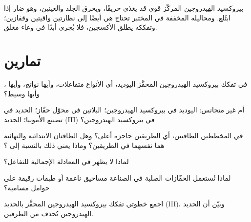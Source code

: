 \begin{safety}{}
بيروكسيد الهيدروجين المركّز  قوي قد يغذي حريقًا،
ويحرق الجلد والعينين، وهو ضار إذا ابتُلع. ومحاليله المخففة
في المختبر تحتاج هي أيضًا إلى نظارتين واقيتين وقفازين؛ وتفككه
يطلق الأكسجين، فلا يُجرى أبدًا في وعاء مغلق.
\end{safety}

\section{تمارين}


\begin{exercise}[$\star$]\label{exo:g12:catalysis:1}
في تفكك بيروكسيد الهيدروجين المحفَّز  اليوديد، أي
الأنواع متفاعلات، وأيها نواتج، وأيها ، وأيها
وسيط؟
\end{exercise}

\begin{exercise}[$\star$]\label{exo:g12:catalysis:2}
 أم غير متجانس:  اليوديد في  بيروكسيد
الهيدروجين؛ البلاتين في محوّل حفّاز؛ الحديد في تصنيع
الأمونيا؛  الحديد (III) في  بيروكسيد الهيدروجين؟
\end{exercise}

\begin{exercise}[$\star$]\label{exo:g12:catalysis:3}
في المخططين الطاقيين، أي الطريقين حاجزه أعلى؟ وهل الطاقتان
الابتدائية والنهائية هما نفسهما في الطريقين؟ وماذا يعني ذلك
بالنسبة إلى ؟
\end{exercise}

\begin{exercise}[$\star$]\label{exo:g12:catalysis:4}
لماذا لا يظهر  في المعادلة الإجمالية للتفاعل؟
\end{exercise}

\begin{exercise}[$\star$]\label{exo:g12:catalysis:5}
لماذا تُستعمل الحفّازات الصلبة في الصناعة مساحيق ناعمة أو طبقات
رقيقة على حوامل مسامية؟
\end{exercise}

\begin{exercise}[$\star\star$]\label{exo:g12:catalysis:6}
اجمع خطوتي تفكك بيروكسيد الهيدروجين المحفَّز بالحديد (III)،
وبيّن أن  الحديد  الهيدروجين تُحذف من الطرفين.
\end{exercise}

